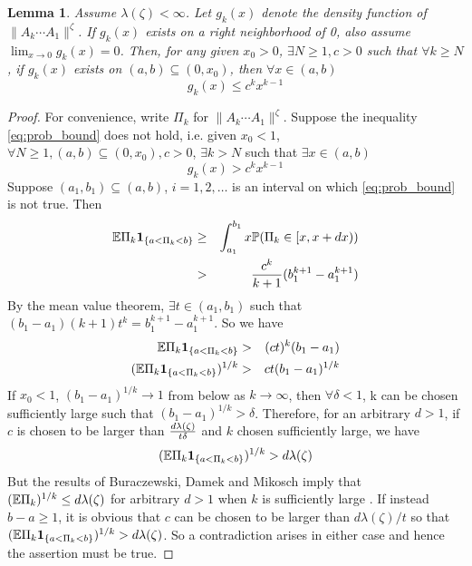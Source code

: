 \documentclass{article}
\newtheorem{lemma}{Lemma}
\theoremstyle{remark}
\begin{document}
\begin{lemma}\label{lemma:prob_bound}
  Assume $\lambda(\zeta) < \infty$. Let $g_k(x)$ denote the density
  function of $\|A_k \cdots A_1\|^\zeta$. If $g_k(x)$ exists on a
  right neighborhood of 0, also assume $\lim_{x\to 0} g_k(x) =
  0$. Then, for any given $x_0 > 0$, $\exists N \geq 1, c >
  0$ such that $\forall k \geq N$, if $g_k(x)$ exists on $(a, b)
  \subseteq (0, x_0)$, then $\forall x \in (a, b)$
  \begin{equation}
    \label{eq:prob_bound}
    g_k(x) \leq c^k x^{k-1}
  \end{equation}
\end{lemma}

\begin{proof}
  For convenience, write $\Pi_k$ for $\|A_k \cdots A_1\|^\zeta$. Suppose
  the inequality \eqref{eq:prob_bound} does not hold, i.e. given
  $x_0 < 1$, $\forall N \geq 1, (a, b) \subseteq (0, x_0), c
  > 0$, $\exists k > N$ such that $\exists x \in  (a, b)$
  \begin{equation*}
    g_k(x) > c^k x^{k-1}
  \end{equation*}
  Suppose $(a_1, b_1) \subseteq (a, b)$, $i = 1, 2, \dots$ is
  an interval on which \eqref{eq:prob_bound} is not true. Then
  \begin{eqnarray*}
    \mathbb{E} \Pi_k \mathbf{1}_{\{a < \Pi_k < b\}} &\geq&
    \int_{a_1}^{b_1} x \mathbb{P}(\Pi_k \in [x, x+dx)) \\
    &>& {c^k \over k + 1} (b_1^{k+1} - a_1^{k+1})
  \end{eqnarray*}
  By the mean value theorem, $\exists t \in (a_1, b_1)$ such that
  $(b_1 - a_1)(k+1) t^k = b_1^{k+1} - a_1^{k+1}$. So we have
  \begin{eqnarray*}
    \mathbb{E} \Pi_k \mathbf{1}_{\{a < \Pi_k < b\}} &>& (c t)^k(b_1 - a_1) \\
    (\mathbb{E} \Pi_k \mathbf{1}_{\{a < \Pi_k < b\}})^{1/k} &>& c t (b_1 - a_1)^{1/k}
  \end{eqnarray*}
  If $x_0 < 1$, $(b_1 - a_1)^{1/k} \to 1$ from below as $k \to
  \infty$, then $\forall \delta < 1$, k can be chosen sufficiently
  large such that $(b_1 - a_1)^{1/k} > \delta$. Therefore, for an arbitrary
  $d > 1$, if $c$ is chosen to be larger than ${d\lambda(\zeta) \over
    t \delta}$ and $k$ chosen sufficiently large, we have
  \[
  (\mathbb{E} \Pi_k \mathbf{1}_{\{a < \Pi_k < b\}})^{1/k} > d \lambda(\zeta)
  \]
  But the results of Buraczewski, Damek and Mikosch imply
  that $(\mathbb{E} \Pi_k)^{1/k} \leq d \lambda(\zeta)$ for arbitrary $d > 1$
  when $k$ is sufficiently large \cite{BuraczewskiDamekMikosch2015}.
  If instead $b - a \geq 1$, it is obvious that $c$ can be chosen to
  be larger than $d\lambda(\zeta)/t$ so that $(\mathbb{E} \Pi_k \mathbf{1}_{\{a < \Pi_k
    < b\}})^{1/k} > d\lambda(\zeta)$.  So a contradiction arises in
  either case and hence the assertion must be true.
\end{proof}
\end{document}
